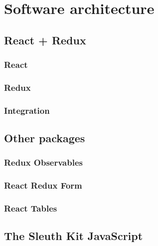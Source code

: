 \chapter{Software architecture}




\section{React + Redux}

\subsection{React}

\subsection{Redux}

\subsection{Integration}

\section{Other packages}

\subsection{Redux Observables}

\subsection{React Redux Form}

\subsection{React Tables}

\section{The Sleuth Kit JavaScript}

